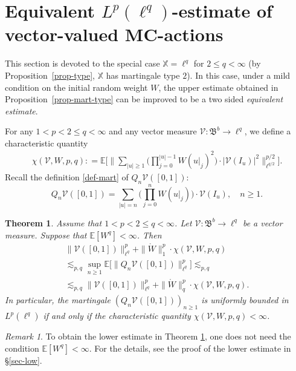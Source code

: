 \documentclass[12pt]{amsart}
\newtheorem{theorem}{Theorem}[section]
\theoremstyle{definition}
\theoremstyle{remark}
\newtheorem*{remark*}{Remark}
\newcommand{\E}{\mathbb{E}}
\newcommand{\fX}{\mathbb{X}}
\numberwithin{equation}{section}
\begin{document}
\section{Equivalent $L^p(\ell^q)$-estimate of vector-valued MC-actions}\label{sec-Lplq}


This section is devoted to the special case $\fX= \ell^q$ for  $2\le q<\infty$ (by  Proposition~\ref{prop-type},  $\fX$ has martingale type $2$). In this case, under a mild condition on the  initial random weight $W$,  the upper estimate  obtained in Proposition~\ref{prop-mart-type} can be improved to be a two sided {\it equivalent estimate}. 

For any $1< p <2 \le q <\infty$ and  any vector measure $\mathcal{V}: \mathfrak{B}^b \rightarrow \ell^q$, we define a characteristic quantity
\begin{align}\label{chi-VWpq}
\chi(\mathcal{V}, W, p, q): =   \E\Big[ \Big\| \sum_{|u|\ge 1}    \Big(  \prod_{j=0}^{|u|-1} W(u|_j)^2 \Big)   \cdot  \big| \mathcal{V}(I_u)  \big|^2       \Big\|_{\ell^{q/2}}^{p/2} \Big].
\end{align}
Recall the definition \eqref{def-mart} of $Q_n\mathcal{V}([0,1])$: 
\[
Q_n\mathcal{V} ([0,1]) = \sum_{|u|=n}  \Big(\prod_{j=0}^n W(u|_j)\Big) \cdot \mathcal{V}(I_u), \quad n\ge 1. 
\] 

\begin{theorem}\label{thm-precise}
Assume that $1<p<2\le q<\infty$.   Let  $\mathcal{V}: \mathfrak{B}^b\rightarrow \ell^q$ be a vector measure. Suppose that $\E[W^q]<\infty$.  Then
\begin{multline*}
\|\mathcal{V}([0,1])\|_{\ell^q}^p +    \|\mathring{W}\|_1^p\cdot    \chi(\mathcal{V}, W, p, q)   
\\
\lesssim_{p,q}\sup_{n\ge 1} \E \Big[ \big  \| Q_n\mathcal{V}([0,1])\big\|_{\ell^q}^p \Big]  \lesssim_{p,q} 
\\
  \lesssim_{p,q}    \|\mathcal{V}([0,1]) \|_{\ell^q}^p +     \|\mathring{W}\|_q^{p}
 \cdot  \chi(\mathcal{V}, W, p, q). 
\end{multline*}  
In particular, the martingale $(Q_n\mathcal{V}([0,1]))_{n\ge 1}$ is uniformly  bounded in $L^p(\ell^q)$  if and only if the characteristic quantity $\chi(\mathcal{V}, W, p, q)<\infty$. 
\end{theorem}



\begin{remark*}
To  obtain the lower estimate in Theorem \ref{thm-precise},  one does not need the condition $\E[W^q]<\infty$.  For the details, see the proof of the lower estimate in  \S \ref{sec-low}.   
\end{remark*}
\end{document}
